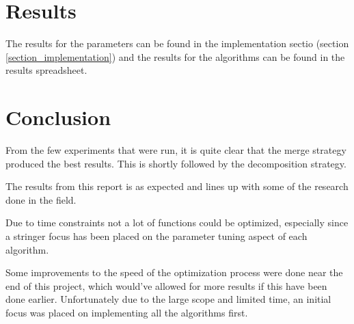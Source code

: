 \documentclass[hidelinks,english,conference]{IEEEtran}
\begin{document}
\section{Results}
	The results for the parameters can be found in the implementation sectio (section \ref{section_implementation}) and the results for the algorithms can be found in the results spreadsheet.

\section{Conclusion}
	From the few experiments that were run, it is quite clear that the merge strategy produced the best results. This is shortly followed by the decomposition strategy.
    
    The results from this report is as expected and lines up with some of the research done in the field.
    
    Due to time constraints not a lot of functions could be optimized, especially since a stringer focus has been placed on the parameter tuning aspect of each algorithm.
    
    Some improvements to the speed of the optimization process were done near the end of this project, which would've allowed for more results if this have been done earlier. Unfortunately due to the large scope and limited time, an initial focus was placed on implementing all the algorithms first.	



\end{document}
